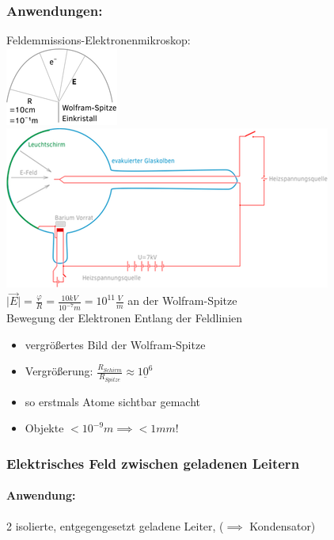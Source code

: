 \documentclass[11pt]{article}
\begin{document}
\subsubsection{Anwendungen:} Feldemmissions-Elektronenmikroskop:
\hfill\\
\includegraphics{skizzen/14/14_8B2}\\

\includegraphics{skizzen/14/14_8B3}\\

$ \vert\vec{E}\vert = \frac{\varphi}{R}= \frac{10kV}{10^{-7}m} = 10^11\frac{V}{m} $ an der Wolfram-Spitze\\
Bewegung der Elektronen Entlang der Feldlinien\\
\begin{itemize}
	\item vergrö\ss{}ertes Bild der Wolfram-Spitze\\
	\item Vergrö\ss{}erung: $\frac{R_{Schirm}}{R_{Spitze}}\approx \underline{10^6}$
	\item so erstmals Atome sichtbar gemacht
	\item Objekte $<10^{-9}m \implies <1mm!$
\end{itemize}

\subsubsection{Elektrisches Feld zwischen geladenen Leitern}

\paragraph{Anwendung:}2 isolierte, entgegengesetzt geladene Leiter, ($\implies$ Kondensator)
\hfill\\
\end{document}
